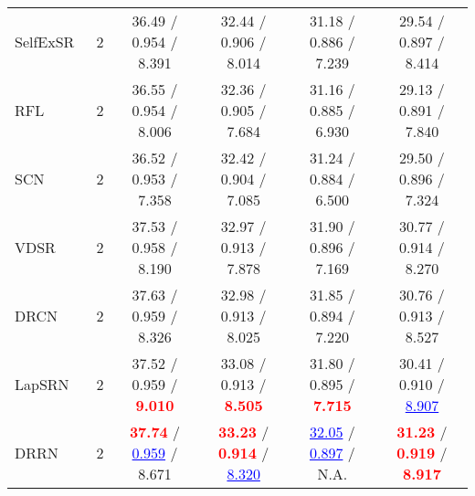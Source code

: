 \documentclass[10pt,twocolumn,letterpaper]{article}
\def\red#1{\textcolor{red}{#1}}
\def\blue#1{\textcolor{blue}{#1}}
\begin{document}
\begin{table*}[t]
\begin{tabular}{lccccc}
SelfExSR~\cite{huang2015single}    & 2                      & 36.49 / 0.954 / 8.391                                                          & 32.44 / 0.906 / 8.014                                                          & 31.18 / 0.886 / 7.239                                                      & 29.54 / 0.897 / 8.414                                                          \\
RFL~\cite{schulter2015fast}        & 2                      & 36.55 / 0.954 / 8.006                                                          & 32.36 / 0.905 / 7.684                                                          & 31.16 / 0.885 / 6.930                                                      & 29.13 / 0.891 / 7.840                                                          \\
SCN~\cite{wang2015deep}            & 2                      & 36.52 / 0.953 / 7.358                                                          & 32.42 / 0.904 / 7.085                                                          & 31.24 / 0.884 / 6.500                                                      & 29.50 / 0.896 / 7.324                                                          \\
VDSR~\cite{kim2016accurate}        & 2                      & 37.53 / 0.958 / 8.190                                                          & 32.97 / 0.913 / 7.878                                                          & 31.90 / 0.896 / 7.169                                                      & 30.77 / 0.914 / 8.270                                                          \\
DRCN~\cite{kim2016deeply}          & 2                      & 37.63 / 0.959 / 8.326                                                          & 32.98 / 0.913 / 8.025                                                          & 31.85 / 0.894 / 7.220                                                      & 30.76 / 0.913 / 8.527                                                          \\
LapSRN~\cite{lai2017deep}          & 2                      & 37.52 / 0.959 / \red{\textbf{9.010}}                                           & 33.08 / 0.913 / \red{\textbf{8.505}}                                           & 31.80 / 0.895 / \red{\textbf{7.715}}                                       & 30.41 / 0.910 / \blue{\underline{8.907}}                                       \\
DRRN~\cite{tai2017image}           & 2                      & \red{\bf 37.74} / \blue{\underline{0.959}} / 8.671                             & \red{\bf 33.23} / \red{\bf 0.914} / \blue{\underline{8.320}}                   & \blue{\underline{32.05}} / \blue{\underline{0.897}} / N.A.                 & \red{\bf 31.23} / \red{\bf 0.919} / \red{\bf 8.917}                            \\

\end{tabular}
\end{table*}
\end{document}
